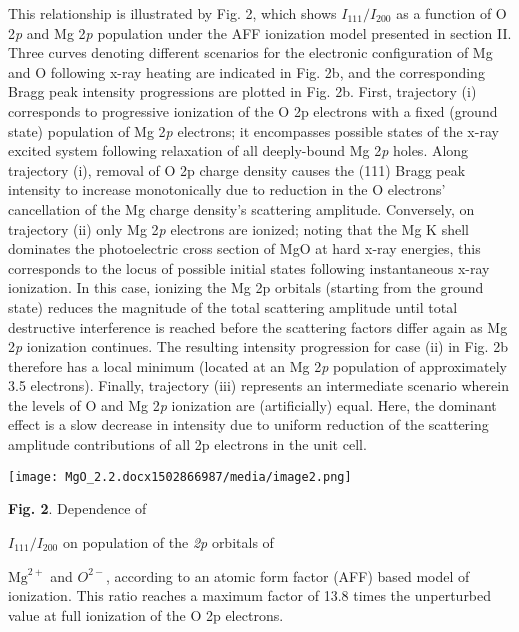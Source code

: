 This relationship is illustrated by Fig. 2, which shows
\(I_{111}/I_{200}\) as a function of O 2\emph{p} and Mg 2\emph{p}
population under the AFF ionization model presented in section II. Three
curves denoting different scenarios for the electronic configuration of
Mg and O following x-ray heating are indicated in Fig. 2b, and the
corresponding Bragg peak intensity progressions are plotted in Fig. 2b.
First, trajectory (i) corresponds to progressive ionization of the O 2p
electrons with a fixed (ground state) population of Mg 2\emph{p}
electrons; it encompasses possible states of the x-ray excited system
following relaxation of all deeply-bound Mg 2\emph{p} holes. Along
trajectory (i), removal of O 2p charge density causes the (111) Bragg
peak intensity to increase monotonically due to reduction in the O
electrons' cancellation of the Mg charge density's scattering amplitude.
Conversely, on trajectory (ii) only Mg 2\emph{p} electrons are ionized;
noting that the Mg K shell dominates the photoelectric cross section of
MgO at hard x-ray energies, this corresponds to the locus of possible
initial states following instantaneous x-ray ionization. In this case,
ionizing the Mg 2p orbitals (starting from the ground state) reduces the
magnitude of the total scattering amplitude until total destructive
interference is reached before the scattering factors differ again as Mg
2\emph{p} ionization continues. The resulting intensity progression for
case (ii) in Fig. 2b therefore has a local minimum (located at an Mg
2\emph{p} population of approximately 3.5 electrons). Finally,
trajectory (iii) represents an intermediate scenario wherein the levels
of O and Mg 2\emph{p} ionization are (artificially) equal. Here, the
dominant effect is a slow decrease in intensity due to uniform reduction
of the scattering amplitude contributions of all 2p electrons in the
unit cell.

\begin{center}
\texttt{[image: MgO\_2.2.docx1502866987/media/image2.png]}
\end{center}
\textbf{Fig. 2}. Dependence of
\(I_{111}/I_{200}\)
on population of the \emph{2p} orbitals of
\(\text{Mg}^{2 +}\)
and \(O^{2 -}\), according to an atomic form factor (AFF) based model of
ionization. This ratio reaches a maximum factor of 13.8 times the
unperturbed value at full ionization of the O 2p electrons.
\bigbreak

